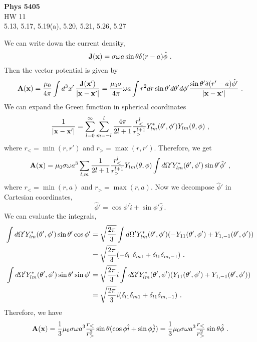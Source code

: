 \documentclass[12pt]{article}
\newcommand{\x}{{\bf x}}
\newcommand{\bJ}{{\bf J}}
\newcommand{\A}{{\bf A}}
\begin{document}
\begin{center}
{\bf Phys 5405}\\
HW 11 \\
5.13, 5.17, 5.19(a), 5.20, 5.21, 5.26, 5.27

\end{center}
 We can write down the current density,
\begin{equation}
    \bJ(\x) = \sigma \omega a \sin\theta \delta(r - a) \hat{\phi}~.
\end{equation}
Then the vector potential is given by
\begin{equation}
    \A(\x) = \frac{\mu_0}{4\pi} \int d^3 x'\, \frac{\bJ(\x')}{|\x - \x'|} = \frac{\mu_0 \sigma}{4\pi} \omega a \int r^2 dr \sin\theta' d \theta' d \phi' \frac{\sin \theta' \delta (r' - a) \hat{\phi'}}{|\x - \x'|}~.
\end{equation}
We can expand the Green function in spherical coordinates
\begin{equation}
    \frac{1}{|\x - \x'|} = \sum_{l=0}^\infty \sum_{m = -l}^l \frac{4\pi}{2l+1} \frac{r_<^l}{r_>^{l+1}} Y^*_{lm}(\theta', \phi') Y_{lm}(\theta, \phi)~,
\end{equation}
where $r_< = \min(r, r')$ and $r_> = \max(r, r')$.
Therefore, we get
\begin{align}
    \A(\x) = \mu_0 \sigma\omega a^3 \sum_{l,m} \frac{1}{2l+1} \frac{r_<^l}{r_>^{l+1}} Y_{lm}(\theta, \phi)\int d\Omega' Y_{lm}^*(\theta', \phi') \sin\theta' \hat{\phi}'~,
\end{align}
where $r_< = \min(r, a)$ and $r_> = \max(r, a)$.
Now we decompose $\hat{\phi}'$ in Cartesian coordinates,
\begin{equation}
    \hat{\phi}' = \cos\phi' \hat{i} + \sin\phi' \hat{j}~.
\end{equation}
We can evaluate the integrals,
\begin{align}
    \int d\Omega' Y^*_{lm}(\theta', \phi') \sin\theta' \cos \phi' &= \sqrt{\frac{2\pi}{3}}\int d\Omega' Y^*_{lm}(\theta', \phi') (-Y_{11}(\theta', \phi') + Y_{1,-1}(\theta', \phi'))\cr
    &=\sqrt{\frac{2\pi}{3}} (-\delta_{l1} \delta_{m1} + \delta_{l1}\delta_{m,-1})~.\\
    \int d\Omega' Y^*_{lm}(\theta', \phi') \sin\theta' \sin \phi' &= \sqrt{\frac{2\pi}{3}} i \int d\Omega' Y^*_{lm}(\theta', \phi') (Y_{11}(\theta', \phi') + Y_{1,-1}(\theta', \phi'))\cr
    &= \sqrt{\frac{2\pi}{3}} i (\delta_{l1}\delta_{m1} + \delta_{l1}\delta_{m,-1})~.
\end{align}
Therefore, we have
\begin{equation}
    \A(\x) = \frac{1}{3} \mu_0 \sigma \omega a^3 \frac{r_<}{r_>^2} \sin\theta (\cos \phi \hat{i} + \sin \phi \hat{j}) =  \frac{1}{3} \mu_0 \sigma \omega a^3 \frac{r_<}{r_>^2} \sin\theta \hat{\phi}~.
\end{equation}
\end{document}
